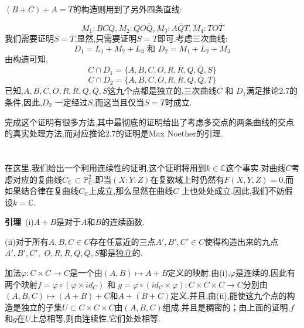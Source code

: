 \documentclass[UTF8]{book}
\begin{document}
		$(B+C)+A=\overline{T}$的构造则用到了另外四条直线:
		
		\begin{equation*}
			M_{1}:BCQ,M_{2}:QO\overline{Q},M_{3}:A\overline{Q}T,M_{4}:TO\overline{T}
		\end{equation*}
		我们需要证明$\overline{S}=\overline{T}$,显然,只需要证明$S=T$即可.考虑三次曲线:
		\begin{equation*}
		D_{1}=L_{1}+M_{2}+L_{3} \text { 和 }D_{2}=M_{1}+L_{2}+M_{3}
		\end{equation*}
		由构造可知,
		\begin{equation*}
		C \cap D_{1}=\{A, B, C, O,R, \overline{R}, Q, \overline{Q}, S\}
		\end{equation*}
		\begin{equation*}
		C \cap D_{2}=\{A, B, C, O,R, \overline{R}, Q, \overline{Q}, T\}
		\end{equation*}
		已知,$ A, B, C, O,R, \overline{R}, Q, \overline{Q}, S $这九个点都是独立的,三次曲线$ C $ 和 $ D_{1} $满足推论2.7的条件,因此,$ D_{2} $ 一定经过$ S $,而这当且仅当$S=T$时成立.
		
		
		完成这个证明有很多方法,其中最彻底的证明给出了考虑多交点的两条曲线的交点的真实处理方法,而对应推论2.7的证明是Max Noether的引理.
		
	\section{}
		在这里,我们给出一个利用连续性的证明,这个证明将用到$ k \in \mathbb{C} $这个事实.对曲线$ C $考虑对应的复曲线$C_{\mathbb{C}} \subset \mathbb{P}^{2}_\mathbb{C}$,即当$ (X:Y:Z) $在复数域上时仍然有$ F(X,Y,Z)=0 $.而如果结合律在复曲线$ C_{\mathbb{C}} $上成立,那么显然在曲线$ C $ 上也处处成立.因此,我们不妨假设$ k = \mathbb{C} $.
		
		\textbf{引理}\ (i)$ A+B $是对于$ A $和$ B $的连续函数.
		
		
		(ii)对于所有$ A,B,C \in C $存在任意近的三点$ A',B',C' \in C $使得构造出来的九点$ A', B', C', $  $O,R, \overline{R}, Q, \overline{Q}, S $都是独立的.
		
		
		加法$\varphi: C \times C \rightarrow C$是一个由$(A, B) \mapsto A+B$定义的映射.由(i),$ \varphi $是连续的,因此有两个映射$f=\varphi \circ(\varphi \times id_{C})$  和  $g=\varphi \circ(id_{C} \times \varphi): C \times C \times C \rightarrow C$分别由$(A, B,C) \mapsto (A+B)+C$和$ A+(B+C )$定义.并且,由(ii),能使这九个点的构造是独立的子集$ U \subset C \times C \times C  $由$ (A,B,C) $组成,并且是稠密的；由上面的证明,$ f $和$ g $在$ U $上总相等,则由连续性,它们处处相等.
		
\end{document}

